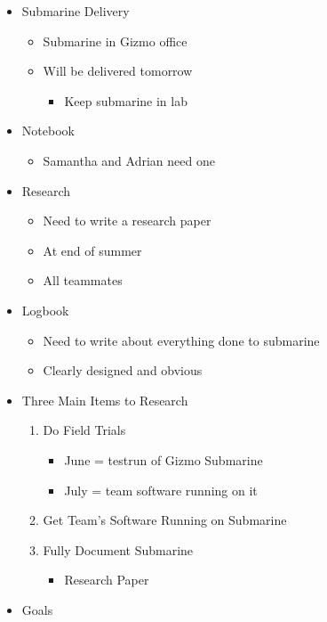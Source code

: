 \documentclass[12pt]{article}
\begin{document}
			\noindent
			\begin{itemize}
				\item Submarine Delivery 
				\begin{itemize}
					\item Submarine in Gizmo office
					\item Will be delivered tomorrow
					\begin{itemize}
						\item Keep submarine in lab
					\end{itemize}
				\end{itemize}
				\item Notebook
				\begin{itemize}
					\item Samantha and Adrian need one
				\end{itemize}
				\item Research
				\begin{itemize}
					\item Need to write a research paper
					\item At end of summer
					\item All teammates
				\end{itemize}
				\item Logbook
				\begin{itemize}
					\item Need to write about everything done to submarine
					\item Clearly designed and obvious
				\end{itemize}
				\item Three Main Items to Research
				\begin{enumerate}
					\item Do Field Trials
					\begin{itemize}
						\item June = testrun of Gizmo Submarine
						\item July = team software running on it
					\end{itemize}
					\item Get Team's Software Running on Submarine
					\item Fully Document Submarine
					\begin{itemize}
						\item Research Paper
					\end{itemize}
				\end{enumerate}
				\item Goals
				\begin{itemize}

\end{itemize}
\end{itemize}
\end{document}
